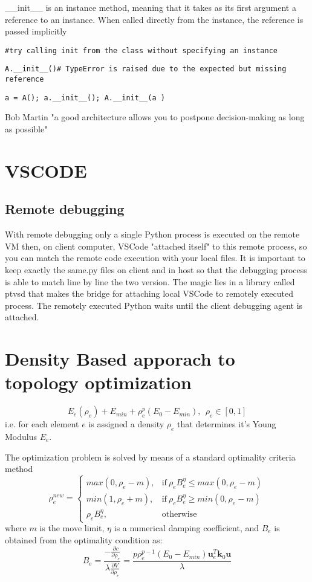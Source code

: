 \documentclass{article}
\begin{document}
\_\_init\_\_ is an instance method, meaning that it takes as its first argument a reference to an instance. When called directly from the instance, the reference is passed implicitly

\texttt{\#try calling init from the class without specifying an instance}

\texttt{A.\_\_init\_\_()\# TypeError is raised due to the expected but missing reference}

\texttt{a = A(); a.\_\_init\_\_(); A.\_\_init\_\_(a  )}


Bob Martin "a good architecture allows you to postpone decision-making as long as possible"
\section{VSCODE}
\subsection*{Remote debugging}
With remote debugging only a single Python process is executed on the remote VM then, on client computer, VSCode "attached itself" to this remote process, so you can match the remote code execution with your local files. It is important to keep exactly the same.py files on client and in host so that the debugging process is able to match line by line the two version.
The magic lies in a library called ptvsd that makes the bridge for attaching local VSCode to remotely executed process. The remotely executed Python waits until the client debugging agent is attached.

\section{Density Based apporach to topology optimization}
\begin{equation*}
    E_{e}(\rho_e) + E_{min} + \rho_{e}^p(E_0 - E_{min}), \ \  \rho_e \in [0,1]
\end{equation*}
i.e. for each element $e$ is assigned a density $\rho_e$ that determines it's Young Modulus $E_e$.

The optimization problem is solved by means of a standard optimality criteria method
\begin{equation*}
    \rho_{e}^{new}=
    \begin{cases}
        max(0, \rho_{e}-m), & \text{if} \ \rho_{e}B_{e}^{\eta}\leq max(0, \rho_{e}-m)  \\
        min(1, \rho_{e}+m), & \text{if} \ \rho_{e}B_{e}^{\eta}\geq min(0, \rho_{e}-m) \\
        \rho_{e}B_{e}^{\eta}, & \text{otherwise}
    \end{cases}
\end{equation*}
where $m$ is the move limit, $\eta$ is a numerical damping coefficient, and $B_e$ is obtained from the optimality condition as:
\begin{equation*}
    B_e = \frac{-\frac{\partial c}{\partial \rho_e}}{\lambda\frac{\partial V}{\partial \rho_e}} = \frac{p\rho_{e}^{p-1}(E_0 - E_{min})\bm{u}_{e}^T\bm{k}_0\bm{u}}{\lambda}
\end{equation*}
\end{document}
